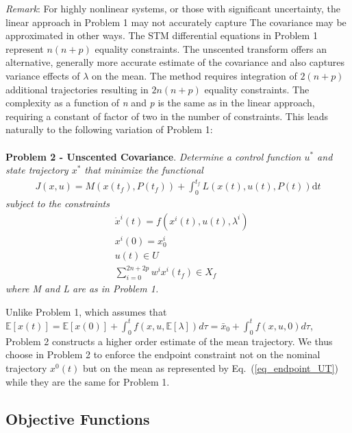 \documentclass[10pt,a4paper]{article}
\begin{document}
	\textit{Remark}: For highly nonlinear systems, or those with significant uncertainty, the linear approach in Problem 1 may not accurately capture  The covariance may be approximated in other ways. The STM differential equations in Problem 1 represent $n(n+p)$ equality constraints. The unscented transform \cite{UT,UKF1} offers an alternative, generally more accurate estimate of the covariance and also captures variance effects of $\lambda$ on the mean. The method requires integration of $2(n+p)$ additional trajectories resulting in $2n(n+p)$ equality constraints. The complexity as a function of \textit{n} and \textit{p} is the same as in the linear approach, requiring a constant of factor of two in the number of constraints. This leads naturally to the following variation of Problem 1:
	\\\\
	\textbf{Problem 2 - Unscented Covariance}. \textit{Determine a control function $ u^* $ and state trajectory $ x^* $ that minimize the functional}
		\begin{align}
		J(x,u) = M(x(t_f),P(t_f)) + \int_{0}^{t_f}L(x(t),u(t),P(t))\mathrm{d}t
		\end{align}
		\textit{	subject to the constraints }
		\begin{align}
		&\dot{x}^i(t) = f(x^i(t),u(t),\lambda^i) \\
		&x^i(0) = x^i_0 \\
		&u(t) \in U \\
		&\sum_{i=0}^{2n+2p}w^ix^i(t_f) \in X_f \label{eq_endpoint_UT}
		\end{align}
	\textit{where M and L are as in Problem 1.}
		
	Unlike Problem 1, which assumes that $\mathbb{E}[x(t)] = \mathbb{E}[x(0)] + \int_{0}^{t} f(x,u,\mathbb{E}[\lambda]) d\tau = \bar{x}_0 + \int_{0}^{t} f(x,u,0) d\tau$, Problem 2 constructs a higher order estimate of the mean trajectory. We thus choose in Problem 2 to enforce the endpoint constraint not on the nominal trajectory $x^0(t)$ but on the mean as represented by Eq.~(\ref{eq_endpoint_UT}) while they are the same for Problem 1.
	
	
	
	\subsection{Objective Functions}
	
\end{document}
